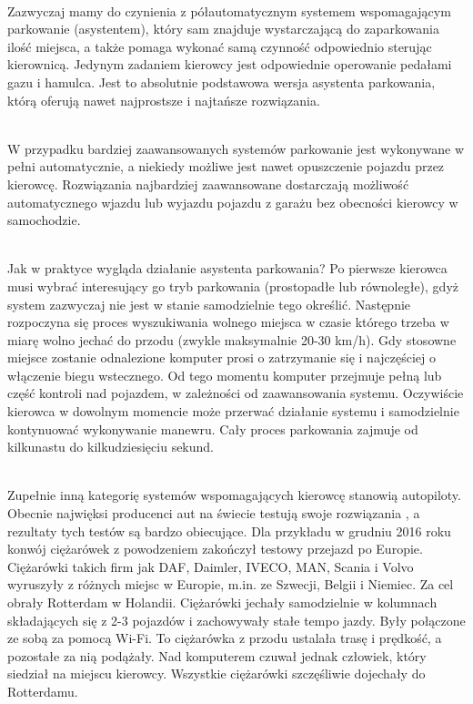 \documentclass[a4paper,11pt,twoside]{report}
\theoremstyle{definition}
\begin{document}
~\\Zazwyczaj mamy do czynienia z półautomatycznym systemem wspomagającym parkowanie (asystentem), który sam znajduje  wystarczającą do zaparkowania ilość miejsca, a także pomaga wykonać samą czynność odpowiednio sterując kierownicą. Jedynym zadaniem kierowcy jest odpowiednie operowanie pedałami gazu i hamulca. Jest to absolutnie podstawowa wersja asystenta parkowania, którą oferują nawet najprostsze i najtańsze rozwiązania. 


~\\W przypadku bardziej zaawansowanych systemów parkowanie jest wykonywane w pełni automatycznie, a niekiedy możliwe jest nawet opuszczenie pojazdu przez kierowcę. Rozwiązania najbardziej zaawansowane dostarczają możliwość automatycznego wjazdu lub wyjazdu pojazdu z garażu bez obecności kierowcy w samochodzie.

~\\Jak w praktyce wygląda działanie asystenta parkowania? Po pierwsze kierowca musi wybrać interesujący go tryb parkowania (prostopadłe lub równoległe), gdyż system zazwyczaj nie jest w stanie samodzielnie tego określić. Następnie rozpoczyna się proces wyszukiwania wolnego miejsca w czasie którego trzeba w miarę wolno jechać do przodu (zwykle maksymalnie 20-30 km/h). Gdy stosowne miejsce zostanie odnalezione komputer prosi o zatrzymanie się i najczęściej o włączenie biegu wstecznego. Od tego momentu komputer przejmuje pełną lub część kontroli nad pojazdem, w zależności od zaawansowania systemu. Oczywiście kierowca w dowolnym momencie może przerwać działanie systemu i samodzielnie kontynuować wykonywanie manewru. Cały proces parkowania zajmuje od kilkunastu do kilkudziesięciu sekund.

~\\Zupełnie inną kategorię systemów wspomagających kierowcę stanowią autopiloty. Obecnie najwięksi producenci aut na świecie testują swoje rozwiązania , a rezultaty tych testów są bardzo obiecujące. Dla przykładu w grudniu 2016 roku konwój ciężarówek z powodzeniem zakończył testowy przejazd po Europie. Ciężarówki takich firm jak DAF, Daimler, IVECO, MAN, Scania i Volvo wyruszyły z różnych miejsc w Europie, m.in. ze Szwecji, Belgii i Niemiec. Za cel obrały Rotterdam w Holandii. Ciężarówki jechały samodzielnie w kolumnach składających się z 2-3 pojazdów i zachowywały stałe tempo jazdy. Były połączone ze sobą za pomocą Wi-Fi. To ciężarówka z przodu ustalała trasę i prędkość, a pozostałe za nią podążały. Nad komputerem czuwał jednak człowiek, który siedział na miejscu kierowcy. Wszystkie ciężarówki szczęśliwie dojechały do Rotterdamu. 
\end{document}
